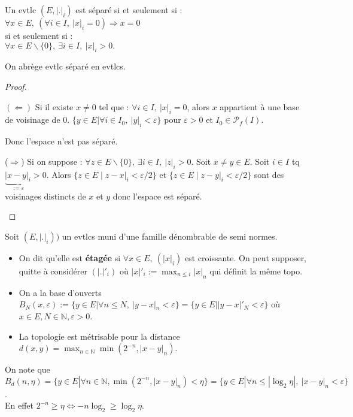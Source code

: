 \begin{lemme}
    Un evtlc $(E,|.|_i)$ est séparé si et seulement si : \\
    $\forall x\in E, \ (\forall i\in I,\ |x|_i=0)\Rightarrow x=0  $ \\
    si et seulement si : \\
    $\forall x\in E\backslash \{0\} ,\ \exists i\in I,\ |x|_i>0. $

    On abrège evtlc séparé en evtlcs.
\end{lemme}
\begin{proof}
    \begin{itemize}
        $(\Leftarrow)$ Si il existe $x \neq 0$ tel que : $\forall i\in I, \ |x|_i=0 $, alors $x$ appartient à une base de voisinage de $0$. $\{y\in E|\forall i\in I_0,\ |y|_i<\varepsilon  \}$ pour $\varepsilon>0$ et $I_0 \in \mathcal{P}_f(I)$. 
        
        Donc l'espace n'est pas séparé.
        
        ($\Rightarrow$) Si on suppose : $\forall z\in E\backslash \{0\} ,\ \exists i \in I,~ |z|_i>0$. Soit $x\neq y\in E$. Soit $i\in I$ tq $\underbrace{|x-y|_i}_{:=\varepsilon} >0$. Alors $\{z\in E\mid z-x|_i<\varepsilon /2\} $ et $\{z\in E\mid z-y|_i<\varepsilon /2\} $ sont des voisinages distincts de $x$ et $y$ donc l'espace est séparé.
    \end{itemize}
\end{proof}

Soit $(E,|.|_i))$ un evtlcs muni d'une famille dénombrable de semi normes.
\begin{itemize}
    \item On dit qu'elle est \textbf{étagée} si $\forall x\in E,\ (|x|_i) $ est croissante. On peut supposer, quitte à considérer $(|.|'_i)$ où $|x|'_i:=\max_{n\le i }|x|_n$ qui définit la même topo.
    \item On a la base d'ouverts $B_N(x,\varepsilon ):=\{y\in E|\forall n\le N,\ |y-x|_n<\varepsilon  \} =\{y\in E| |y-x|'_N<\varepsilon \} $ où $x\in E, N\in \mathbb{N} ,\varepsilon >0$.
    \item La topologie est métrisable pour la distance $d(x,y)=\max_{n\in \mathbb{N} }\min(2^{-n}, |x-y|_n)$.
\end{itemize}

On note que $B_d(n, \eta)=\{y\in E| \forall n\in \mathbb{N} , \min(2^{-n},|x-y|_n)< \eta\} =\{y\in E| \forall n\le |\log_2\eta|,\ |x-y|_n<\varepsilon  \} $.\\
En effet $2^{-n}\ge \eta\Leftrightarrow -n\log_2\ge  \log_2\eta$.\\

